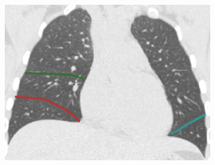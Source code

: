 {\begin{figure}[htbp]
\begin{subfigure}{.32\linewidth}
  \includegraphics[width=\linewidth,trim={{.0\wd0} {.0\wd0} {.0\wd0} {.0\wd0}},clip]{Segmentation/Image/H1335_FRC_PCAInitial_Coronal.png}
  \caption{}
  \label{fig:HLASegmentationResults-h} 
\end{subfigure}
\begin{subfigure}{.32\linewidth}%

\end{subfigure}
\end{figure}}
